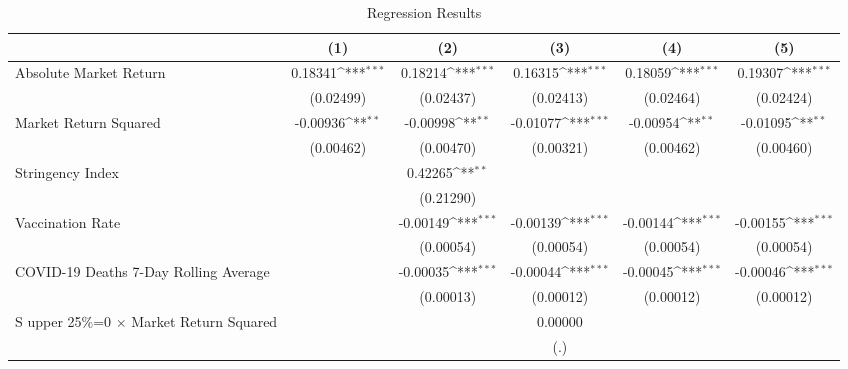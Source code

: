 \begin{table}[htbp]\centering
\def\sym#1{\ifmmode^{#1}\else\(^{#1}\)\fi}
\caption{Regression Results \label{reg1}}
\begin{tabular}{l*{5}{c}}
\toprule
                    &\multicolumn{1}{c}{(1)}         &\multicolumn{1}{c}{(2)}         &\multicolumn{1}{c}{(3)}         &\multicolumn{1}{c}{(4)}         &\multicolumn{1}{c}{(5)}         \\
\midrule
Absolute Market Return&     0.18341\sym{***}&     0.18214\sym{***}&     0.16315\sym{***}&     0.18059\sym{***}&     0.19307\sym{***}\\
                    &   (0.02499)         &   (0.02437)         &   (0.02413)         &   (0.02464)         &   (0.02424)         \\
\addlinespace
Market Return Squared&    -0.00936\sym{**} &    -0.00998\sym{**} &    -0.01077\sym{***}&    -0.00954\sym{**} &    -0.01095\sym{**} \\
                    &   (0.00462)         &   (0.00470)         &   (0.00321)         &   (0.00462)         &   (0.00460)         \\
\addlinespace
Stringency Index    &                     &     0.42265\sym{**} &                     &                     &                     \\
                    &                     &   (0.21290)         &                     &                     &                     \\
\addlinespace
Vaccination Rate    &                     &    -0.00149\sym{***}&    -0.00139\sym{***}&    -0.00144\sym{***}&    -0.00155\sym{***}\\
                    &                     &   (0.00054)         &   (0.00054)         &   (0.00054)         &   (0.00054)         \\
\addlinespace
COVID-19 Deaths 7-Day Rolling Average&                     &    -0.00035\sym{***}&    -0.00044\sym{***}&    -0.00045\sym{***}&    -0.00046\sym{***}\\
                    &                     &   (0.00013)         &   (0.00012)         &   (0.00012)         &   (0.00012)         \\
\addlinespace
S upper 25\%=0 $\times$ Market Return Squared&                     &                     &     0.00000         &                     &                     \\
                    &                     &                     &         (.)         &                     &                     \\

\end{tabular}
\end{table}
